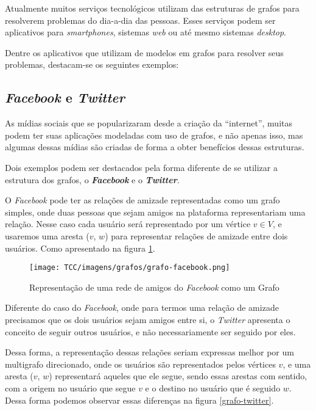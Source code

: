 Atualmente muitos serviços tecnológicos utilizam das estruturas de grafos para resolverem problemas do dia-a-dia das pessoas. Esses serviços podem ser aplicativos para \textit{smartphones}, sistemas \textit{web} ou até mesmo sistemas \textit{desktop}.

Dentre os aplicativos que utilizam de modelos em grafos para resolver seus problemas, destacam-se os seguintes exemplos:


\subsection{\textit{Facebook} e \textit{Twitter}}
    
As mídias sociais que se popularizaram desde a criação da “internet”, muitas podem ter suas aplicações modeladas com uso de grafos, e não apenas isso, mas algumas dessas mídias são criadas de forma a obter benefícios dessas estruturas.

Dois exemplos podem ser destacados pela forma diferente de se utilizar a estrutura dos grafos, o \textbf{\textit{Facebook}} e o \textbf{\textit{Twitter}}. 
    
    O \textit{Facebook} pode ter as relações de amizade representadas como um grafo simples, onde duas pessoas que sejam amigos na plataforma representariam uma relação. Nesse caso cada usuário será representado por um vértice $v \in V$, e usaremos uma aresta ($v$, $w$) para representar relações de amizade entre dois usuários. Como apresentado na figura \ref{grafo-facebook}.
    
    \begin{figure}[H]
         \centering
         \texttt{[image: TCC/imagens/grafos/grafo-facebook.png]}
         \caption{Representação de uma rede de amigos do \textit{Facebook} como um Grafo}
         \label{grafo-facebook}
    \end{figure}

Diferente do caso do \textit{Facebook}, onde para termos uma relação de amizade precisamos que os dois usuários sejam amigos entre si, o \textit{Twitter} apresenta o conceito de seguir outros usuários, e não necessariamente ser seguido por eles.

Dessa forma, a representação dessas relações seriam expressas melhor por um multigrafo direcionado, onde os usuários são representados pelos vértices $v$, e uma aresta ($v$, $w$) representará aqueles que ele segue, sendo essas arestas com sentido, com a origem no usuário que segue $v$ e o destino no usuário que é seguido $w$. Dessa forma podemos observar essas diferenças na figura \ref{grafo-twitter}.
    
